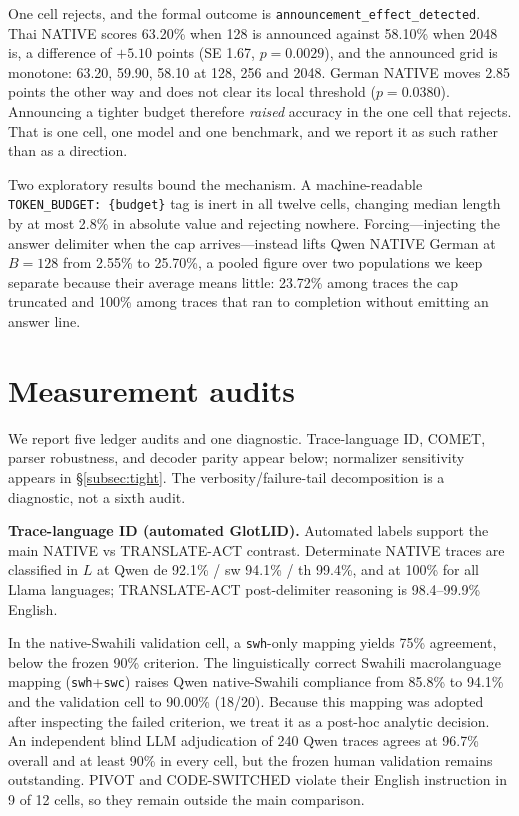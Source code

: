 \documentclass[11pt]{article}
\begin{document}
One cell rejects, and the formal outcome is \texttt{announcement\_effect\_detected}. Thai NATIVE scores 63.20\% when 128 is announced against 58.10\% when 2048 is, a difference of \(+5.10\) points (SE 1.67, \(p=0.0029\)), and the announced grid is monotone: 63.20, 59.90, 58.10 at 128, 256 and 2048. German NATIVE moves 2.85 points the other way and does not clear its local threshold (\(p=0.0380\)). Announcing a tighter budget therefore \emph{raised} accuracy in the one cell that rejects. That is one cell, one model and one benchmark, and we report it as such rather than as a direction.

Two exploratory results bound the mechanism. A machine-readable \texttt{TOKEN\_BUDGET: \{budget\}} tag is inert in all twelve cells, changing median length by at most 2.8\% in absolute value and rejecting nowhere. Forcing---injecting the answer delimiter when the cap arrives---instead lifts Qwen NATIVE German at \(B=128\) from 2.55\% to 25.70\%, a pooled figure over two populations we keep separate because their average means little: 23.72\% among traces the cap truncated and 100\% among traces that ran to completion without emitting an answer line.

\section{Measurement audits}
\label{sec:audits}

We report five ledger audits and one diagnostic. Trace-language ID, COMET, parser robustness, and decoder parity appear below; normalizer sensitivity appears in \S\ref{subsec:tight}. The verbosity/failure-tail decomposition is a diagnostic, not a sixth audit.

\textbf{Trace-language ID (automated GlotLID).} Automated labels support the main NATIVE vs TRANSLATE-ACT contrast. Determinate NATIVE traces are classified in \(L\) at Qwen de 92.1\% / sw 94.1\% / th 99.4\%, and at 100\% for all Llama languages; TRANSLATE-ACT post-delimiter reasoning is 98.4--99.9\% English.

In the native-Swahili validation cell, a \texttt{swh}-only mapping yields 75\% agreement, below the frozen 90\% criterion. The linguistically correct Swahili macrolanguage mapping (\texttt{swh}+\texttt{swc}) raises Qwen native-Swahili compliance from 85.8\% to 94.1\% and the validation cell to 90.00\% (18/20). Because this mapping was adopted after inspecting the failed criterion, we treat it as a post-hoc analytic decision. An independent blind LLM adjudication of 240 Qwen traces agrees at 96.7\% overall and at least 90\% in every cell, but the frozen human validation remains outstanding. PIVOT and CODE-SWITCHED violate their English instruction in 9 of 12 cells, so they remain outside the main comparison.
\end{document}
